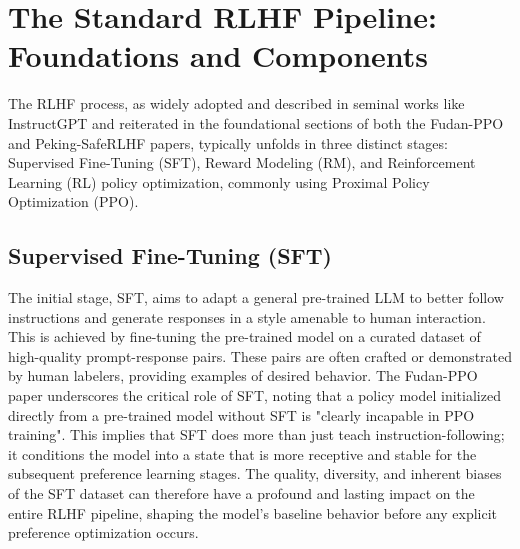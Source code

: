 \documentclass[10pt,journal,compsoc]{IEEEtran} %
\begin{document}
\section{The Standard RLHF Pipeline: Foundations and Components}
\label{sec:standard_rlhf}

The RLHF process, as widely adopted and described in seminal works like InstructGPT \cite{Ouyang2022InstructGPT} and reiterated in the foundational sections of both the Fudan-PPO \cite{Zheng2023PPO} and Peking-SafeRLHF \cite{Dai2023SafeRLHF} papers, typically unfolds in three distinct stages: Supervised Fine-Tuning (SFT), Reward Modeling (RM), and Reinforcement Learning (RL) policy optimization, commonly using Proximal Policy Optimization (PPO).

\subsection{Supervised Fine-Tuning (SFT)}
The initial stage, SFT, aims to adapt a general pre-trained LLM to better follow instructions and generate responses in a style amenable to human interaction. This is achieved by fine-tuning the pre-trained model on a curated dataset of high-quality prompt-response pairs. These pairs are often crafted or demonstrated by human labelers, providing examples of desired behavior. \cite{Ouyang2022InstructGPT} The Fudan-PPO paper underscores the critical role of SFT, noting that a policy model initialized directly from a pre-trained model without SFT is "clearly incapable in PPO training". \cite{Zheng2023PPO} This implies that SFT does more than just teach instruction-following; it conditions the model into a state that is more receptive and stable for the subsequent preference learning stages. The quality, diversity, and inherent biases of the SFT dataset can therefore have a profound and lasting impact on the entire RLHF pipeline, shaping the model's baseline behavior before any explicit preference optimization occurs.
\end{document}
